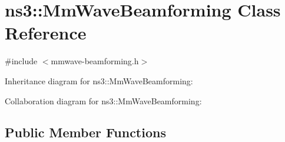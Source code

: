 \hypertarget{classns3_1_1MmWaveBeamforming}{}\section{ns3\+:\+:Mm\+Wave\+Beamforming Class Reference}
\label{classns3_1_1MmWaveBeamforming}


{\ttfamily \#include $<$mmwave-\/beamforming.\+h$>$}



Inheritance diagram for ns3\+:\+:Mm\+Wave\+Beamforming\+:


Collaboration diagram for ns3\+:\+:Mm\+Wave\+Beamforming\+:
\subsection*{Public Member Functions}
